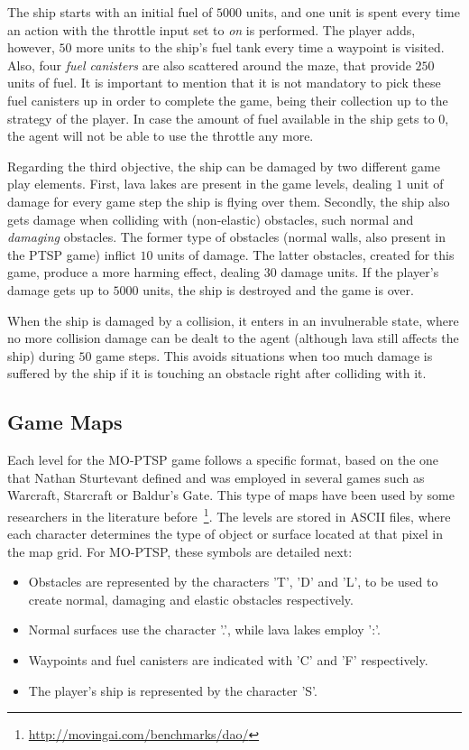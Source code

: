\documentclass[conference]{IEEEtran}
\begin{document}
The ship starts with an initial fuel of $5000$ units, and one unit is spent every time an action with the throttle input set to \textit{on} is performed. The player adds, however, $50$ more units to the ship's fuel tank every time a waypoint is visited. Also, four \textit{fuel canisters} are also scattered around the maze, that provide $250$ units of fuel. It is important to mention that it is not mandatory to pick these fuel canisters up in order to complete the game, being their collection up to the strategy of the player. In case the amount of fuel available in the ship gets to $0$, the agent will not be able to use the throttle any more. 

Regarding the third objective, the ship can be damaged by two different game play elements. First, lava lakes are present in the game levels, dealing $1$ unit of damage for every game step the ship is flying over them. Secondly, the ship also gets damage when colliding with (non-elastic) obstacles, such normal and \textit{damaging} obstacles. The former type of obstacles (normal walls, also present in the PTSP game) inflict $10$ units of damage. The latter obstacles, created for this game, produce a more harming effect, dealing $30$ damage units. If the player's damage gets up to $5000$ units, the ship is destroyed and the game is over.

When the ship is damaged by a collision, it enters in an invulnerable state, where no more collision damage can be dealt to the agent (although lava still affects the ship) during $50$ game steps. This avoids situations when too much damage is suffered by the ship if it is touching an obstacle right after colliding with it.

\subsection{Game Maps}

Each level for the MO-PTSP game follows a specific format, based on the one that Nathan Sturtevant defined and was employed in several games such as Warcraft, Starcraft or Baldur's Gate. This type of maps have been used by some researchers in the literature before~\footnote{\url{http://movingai.com/benchmarks/dao/}}. The levels are stored in ASCII files, where each character determines the type of object or surface located at that pixel in the map grid. For MO-PTSP, these symbols are detailed next:

\begin{itemize}
\item Obstacles are represented by the characters 'T', 'D' and 'L', to be used to create normal, damaging and elastic obstacles respectively.
\item Normal surfaces use the character '.', while lava lakes employ ':'.
\item Waypoints and fuel canisters are indicated with 'C' and 'F' respectively.
\item The player's ship is represented by the character 'S'.
\end{itemize}
\end{document}
